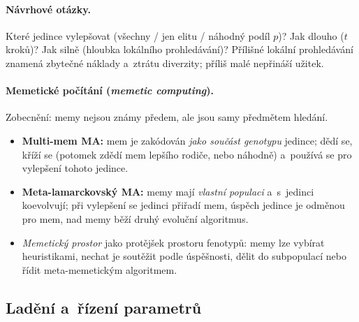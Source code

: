\documentclass[11pt,a4paper]{article}
\theoremstyle{definition}
\begin{document}
\paragraph{Návrhové otázky.} Které jedince vylepšovat (všechny / jen elitu /
náhodný podíl $p$)? Jak dlouho ($t$ kroků)? Jak silně (hloubka lokálního
prohledávání)? Přílišné lokální prohledávání znamená zbytečné náklady
a~ztrátu diverzity; příliš malé nepřináší užitek.

\paragraph{Memetické počítání (\emph{memetic computing}).} Zobecnění:
memy nejsou známy předem, ale jsou samy předmětem hledání.
\begin{itemize}
\item \textbf{Multi-mem MA:} mem je zakódován \emph{jako součást genotypu}
  jedince; dědí se, kříží se (potomek zdědí mem lepšího rodiče, nebo náhodně)
  a~používá se pro vylepšení tohoto jedince.
\item \textbf{Meta-lamarckovský MA:} memy mají \emph{vlastní populaci} a~s~jedinci
  koevolvují; při vylepšení se jedinci přiřadí mem, úspěch jedince je odměnou
  pro mem, nad memy běží druhý evoluční algoritmus.
\item \emph{Memetický prostor} jako protějšek prostoru fenotypů: memy lze
  vybírat heuristikami, nechat je soutěžit podle úspěšnosti, dělit do
  subpopulací nebo řídit meta-memetickým algoritmem.
\end{itemize}

\subsection{Ladění a~řízení parametrů}
\end{document}
